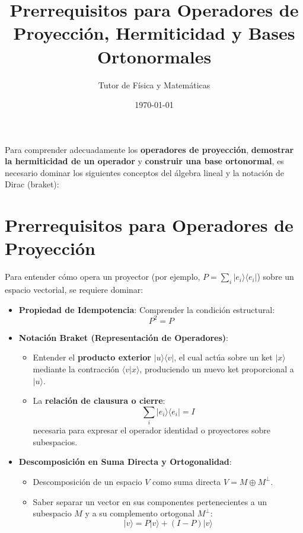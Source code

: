 \documentclass{article}
\title{Prerrequisitos para Operadores de Proyección, Hermiticidad y Bases Ortonormales}
\author{Tutor de Física y Matemáticas}
\date{\today}
\begin{document}
\maketitle

Para comprender adecuadamente los \textbf{operadores de proyección}, \textbf{demostrar la hermiticidad de un operador} y \textbf{construir una base ortonormal}, es necesario dominar los siguientes conceptos del álgebra lineal y la notación de Dirac (braket):

\section{Prerrequisitos para Operadores de Proyección}

Para entender cómo opera un proyector (por ejemplo, $P = \sum_{i} |e_i\rangle\langle e_i|$) sobre un espacio vectorial, se requiere dominar:

\begin{itemize}
    \item \textbf{Propiedad de Idempotencia}: Comprender la condición estructural:
    \[
    P^2 = P
    \]
    \item \textbf{Notación Braket (Representación de Operadores)}:
    \begin{itemize}

        \item Entender el \textbf{producto exterior} $|u\rangle\langle v|$, el cual actúa sobre un ket $|x\rangle$ mediante la contracción $\langle v|x\rangle$, produciendo un nuevo ket proporcional a $|u\rangle$.
        \item La \textbf{relación de clausura o cierre}:
        \[
        \sum_i |e_i\rangle\langle e_i| = I
        \]
        necesaria para expresar el operador identidad o proyectores sobre subespacios.
    \end{itemize}
    \item \textbf{Descomposición en Suma Directa y Ortogonalidad}:
    \begin{itemize}
        \item Descomposición de un espacio $V$ como suma directa $V = M \oplus M^\perp$.
        \item Saber separar un vector en sus componentes pertenecientes a un subespacio $M$ y a su complemento ortogonal $M^\perp$:
        \[
        |v\rangle = P|v\rangle + (I - P)|v\rangle
        \]
    \end{itemize}
\end{itemize}
\end{document}

